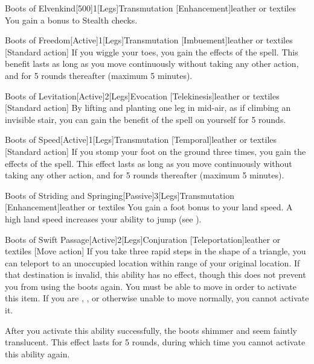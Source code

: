         \begin{magicitemdef}{Boots of Elvenkind}[500]{1}[Legs]{Transmutation [Enhancement]}{leather or textiles}
             You gain a  bonus to Stealth checks.
        \end{magicitemdef}

        \begin{magicitemdef}{Boots of Freedom}[Active]{1}[Legs]{Transmutation [Imbuement]}{leather or textiles}
            [Standard action] If you wiggle your toes, you gain the effects of the  spell.
            This benefit lasts as long as you move continuously without taking any other action, and for 5 rounds thereafter (maximum 5 minutes).
        \end{magicitemdef}

        \begin{magicitemdef}{Boots of Levitation}[Active]{2}[Legs]{Evocation [Telekinesis]}{leather or textiles}
            [Standard action] By lifting and planting one leg in mid-air, as if climbing an invisible stair, you can gain the benefit of the  spell on yourself for 5 rounds.
        \end{magicitemdef}

        \begin{magicitemdef}{Boots of Speed}[Active]{1}[Legs]{Transmutation [Temporal]}{leather or textiles}
            [Standard action] If you stomp your foot on the ground three times, you gain the effects of the  spell.
            This effect lasts as long as you move continuously without taking any other action, and for 5 rounds thereafter (maximum 5 minutes).
        \end{magicitemdef}

        \begin{magicitemdef}{Boots of Striding and Springing}[Passive]{3}[Legs]{Transmutation [Enhancement]}{leather or textiles}
             You gain a  foot bonus to your land speed.
            A high land speed increases your ability to jump (see ).
        \end{magicitemdef}

        \begin{magicitemdef}{Boots of Swift Passage}[Active]{2}[Legs]{Conjuration [Teleportation]}{leather or textiles}
            [Move action] If you take three rapid steps in the shape of a triangle, you can teleport to an unoccupied location within \rngclose range of your original location.
            If that destination is invalid, this ability has no effect, though this does not prevent you from using the boots again.
            You must be able to move in order to activate this item.
            If you are \grappled, \immobilized, or otherwise unable to move normally, you cannot activate it.

            After you activate this ability successfully, the boots shimmer and seem faintly translucent.
            This effect lasts for 5 rounds, during which time you cannot activate this ability again.
        \end{magicitemdef}

